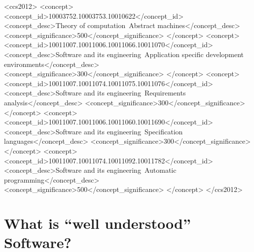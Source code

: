 \documentclass[sigconf,review]{acmart}
\begin{document}
\begin{CCSXML}
<ccs2012>
   <concept>
       <concept_id>10003752.10003753.10010622</concept_id>
       <concept_desc>Theory of computation~Abstract machines</concept_desc>
       <concept_significance>500</concept_significance>
       </concept>
   <concept>
       <concept_id>10011007.10011006.10011066.10011070</concept_id>
       <concept_desc>Software and its engineering~Application specific development environments</concept_desc>
       <concept_significance>300</concept_significance>
       </concept>
   <concept>
       <concept_id>10011007.10011074.10011075.10011076</concept_id>
       <concept_desc>Software and its engineering~Requirements analysis</concept_desc>
       <concept_significance>300</concept_significance>
       </concept>
   <concept>
       <concept_id>10011007.10011006.10011060.10011690</concept_id>
       <concept_desc>Software and its engineering~Specification languages</concept_desc>
       <concept_significance>300</concept_significance>
       </concept>
   <concept>
       <concept_id>10011007.10011074.10011092.10011782</concept_id>
       <concept_desc>Software and its engineering~Automatic programming</concept_desc>
       <concept_significance>500</concept_significance>
       </concept>
 </ccs2012>
\end{CCSXML}



\newtheorem{defn}{Definition}

\maketitle

\section{What is ``well understood'' Software?}\label{ch:wellUnderstood}
\end{document}
